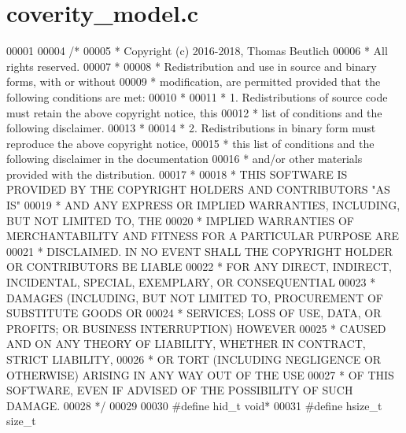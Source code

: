 \hypertarget{coverity__model_8c_source}{}\section{coverity\+\_\+model.\+c}
\label{coverity__model_8c_source}

\begin{DoxyCode}
00001 
00004 \textcolor{comment}{/*}
00005 \textcolor{comment}{ * Copyright (c) 2016-2018, Thomas Beutlich}
00006 \textcolor{comment}{ * All rights reserved.}
00007 \textcolor{comment}{ *}
00008 \textcolor{comment}{ * Redistribution and use in source and binary forms, with or without}
00009 \textcolor{comment}{ * modification, are permitted provided that the following conditions are met:}
00010 \textcolor{comment}{ *}
00011 \textcolor{comment}{ * 1. Redistributions of source code must retain the above copyright notice, this}
00012 \textcolor{comment}{ *    list of conditions and the following disclaimer.}
00013 \textcolor{comment}{ *}
00014 \textcolor{comment}{ * 2. Redistributions in binary form must reproduce the above copyright notice,}
00015 \textcolor{comment}{ *    this list of conditions and the following disclaimer in the documentation}
00016 \textcolor{comment}{ *    and/or other materials provided with the distribution.}
00017 \textcolor{comment}{ *}
00018 \textcolor{comment}{ * THIS SOFTWARE IS PROVIDED BY THE COPYRIGHT HOLDERS AND CONTRIBUTORS "AS IS"}
00019 \textcolor{comment}{ * AND ANY EXPRESS OR IMPLIED WARRANTIES, INCLUDING, BUT NOT LIMITED TO, THE}
00020 \textcolor{comment}{ * IMPLIED WARRANTIES OF MERCHANTABILITY AND FITNESS FOR A PARTICULAR PURPOSE ARE}
00021 \textcolor{comment}{ * DISCLAIMED. IN NO EVENT SHALL THE COPYRIGHT HOLDER OR CONTRIBUTORS BE LIABLE}
00022 \textcolor{comment}{ * FOR ANY DIRECT, INDIRECT, INCIDENTAL, SPECIAL, EXEMPLARY, OR CONSEQUENTIAL}
00023 \textcolor{comment}{ * DAMAGES (INCLUDING, BUT NOT LIMITED TO, PROCUREMENT OF SUBSTITUTE GOODS OR}
00024 \textcolor{comment}{ * SERVICES; LOSS OF USE, DATA, OR PROFITS; OR BUSINESS INTERRUPTION) HOWEVER}
00025 \textcolor{comment}{ * CAUSED AND ON ANY THEORY OF LIABILITY, WHETHER IN CONTRACT, STRICT LIABILITY,}
00026 \textcolor{comment}{ * OR TORT (INCLUDING NEGLIGENCE OR OTHERWISE) ARISING IN ANY WAY OUT OF THE USE}
00027 \textcolor{comment}{ * OF THIS SOFTWARE, EVEN IF ADVISED OF THE POSSIBILITY OF SUCH DAMAGE.}
00028 \textcolor{comment}{ */}
00029 
00030 \textcolor{preprocessor}{#define hid\_t void*}
00031 \textcolor{preprocessor}{#define hsize\_t size\_t}

\end{DoxyCode}

